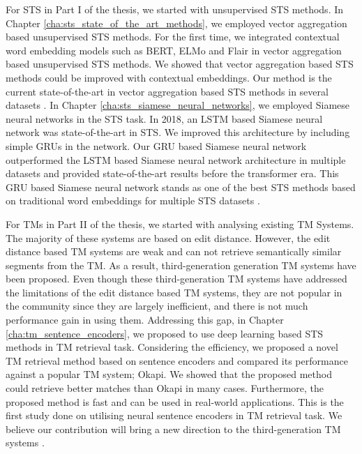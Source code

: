 For STS in Part I of the thesis, we started with unsupervised STS methods. In Chapter \ref{cha:sts_state_of_the_art_methods}, we employed vector aggregation based unsupervised STS methods. For the first time, we integrated contextual word embedding models such as BERT, ELMo and Flair in vector aggregation based unsupervised STS methods. We showed that vector aggregation based STS methods could be improved with contextual embeddings. Our method is the current state-of-the-art in vector aggregation based STS methods in several datasets \autocite{ranasinghe-etal-2019-enhancing}. In Chapter \ref{cha:sts_siamese_neural_networks}, we employed Siamese neural networks in the STS task. In 2018, an LSTM based Siamese neural network was state-of-the-art in STS. We improved this architecture by including simple GRUs in the network. Our GRU based Siamese neural network outperformed the LSTM based Siamese neural network architecture in multiple datasets and provided state-of-the-art results before the transformer era. This GRU based Siamese neural network stands as one of the best STS methods based on traditional word embeddings for multiple STS datasets \autocite{ranasinghe-etal-2019-semantic}.

For TMs in Part II of the thesis, we started with analysing existing TM Systems. The majority of these systems are based on edit distance. However, the edit distance based TM systems are weak and can not retrieve semantically similar segments from the TM. As a result, third-generation generation TM systems have been proposed. Even though these third-generation TM systems have addressed the limitations of the edit distance based TM systems, they are not popular in the community since they are largely inefficient, and there is not much performance gain in using them. Addressing this gap, in Chapter \ref{cha:tm_sentence_encoders}, we proposed to use deep learning based STS methods in TM retrieval task. Considering the efficiency, we proposed a novel TM retrieval method based on sentence encoders and compared its performance against a popular TM system; Okapi. We showed that the proposed method could retrieve better matches than Okapi in many cases. Furthermore, the proposed method is fast and can be used in real-world applications. This is the first study done on utilising neural sentence encoders in TM retrieval task. We believe our contribution will bring a new direction to the third-generation TM systems \autocite{ranasinghe-etal-2020-intelligent, ranasinghe:2021}.

